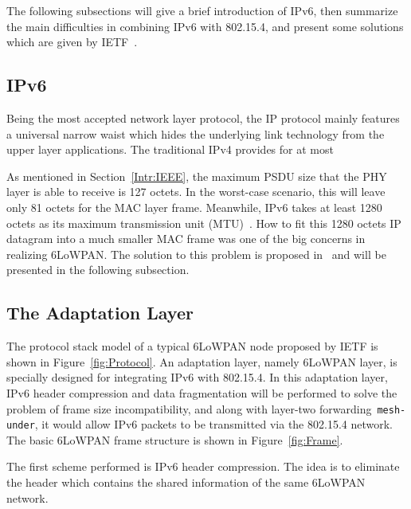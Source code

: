 The following subsections will give a brief introduction of IPv6, then summarize the main difficulties in combining IPv6 with 802.15.4, and present some solutions which are given by IETF~\cite{RFC4944}. 

\subsection{IPv6}
\label{Intro:6LoW:IPv6}
Being the most accepted network layer protocol, the IP protocol mainly features a universal narrow waist which hides the underlying link technology from the upper layer applications. The traditional IPv4 provides for at most %
\newline

As mentioned in Section~\ref{Intr:IEEE}, the maximum PSDU size that the PHY layer  is able to receive is 127 octets. In the worst-case scenario, this will leave only 81 octets for the MAC layer frame. Meanwhile, IPv6 takes at least 1280 octets as its maximum transmission unit (MTU)~\cite{RFC4919}. How to fit this 1280 octets IP datagram into a much smaller MAC frame was one of the big concerns in realizing 6LoWPAN. The solution to this problem is proposed in~\cite{RFC4944} and will be presented in the following subsection.

\subsection{The Adaptation Layer}
\label{Intr:6LoW:Protocol}
The protocol stack model of a typical 6LoWPAN node proposed by IETF is shown in Figure~\ref{fig:Protocol}.  An adaptation layer, namely 6LoWPAN layer, is specially designed for integrating IPv6 with 802.15.4. In this adaptation layer, IPv6 header compression and data fragmentation will be performed to solve the problem of frame size incompatibility, and along with layer-two forwarding~\texttt{mesh-under}, it would allow IPv6 packets to be transmitted via the 802.15.4 network. The basic 6LoWPAN frame structure is shown in Figure~\ref{fig:Frame}. 
\newline

The first scheme performed is IPv6 header compression. The idea is to eliminate the
header which contains the shared information of the same 6LoWPAN network. 

